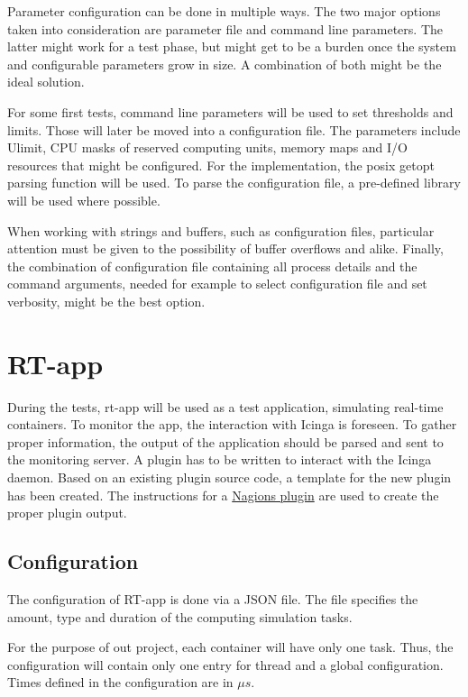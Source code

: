 \documentclass[]{scrartcl}
\begin{document}
Parameter configuration can be done in multiple ways. The two major options taken into consideration are parameter file and command line parameters.
The latter might work for a test phase, but might get to be a burden once the system and configurable parameters grow in size.
A combination of both might be the ideal solution.

For some first tests, command line parameters will be used to set thresholds and limits. Those will later be moved into a configuration file.
The parameters include Ulimit, CPU masks of reserved computing units, memory maps and I/O resources that might be configured. 
For the implementation, the posix getopt parsing function will be used.
To parse the configuration file, a pre-defined library will be used where possible.

When working with strings and buffers, such as configuration files, particular attention must be given to the possibility of buffer overflows and alike.
Finally, the combination of configuration file containing all process details and the command arguments, needed for example to select configuration file and set verbosity, might be the best option.

\section{RT-app}

During the tests, rt-app will be used as a test application, simulating real-time containers. 
To monitor the app, the interaction with Icinga is foreseen.
To gather proper information, the output of the application should be parsed and sent to the monitoring server.
A plugin has to be written to interact with the Icinga daemon.
Based on an existing plugin source code, a template for the new plugin has been created. 
The instructions for a \href{{https://nagios-plugins.org/doc/guidelines.html#DEVREQUIREMENTS}}{Nagions plugin} are used to create the proper plugin output.


\subsection{Configuration}

The configuration of RT-app is done via a JSON file. The file specifies the amount, type and duration of the computing simulation tasks.

For the purpose of out project, each container will have only one task. 
Thus, the configuration will contain only one entry for thread and a global configuration.
Times defined in the configuration are in $\mu s$.
\end{document}
